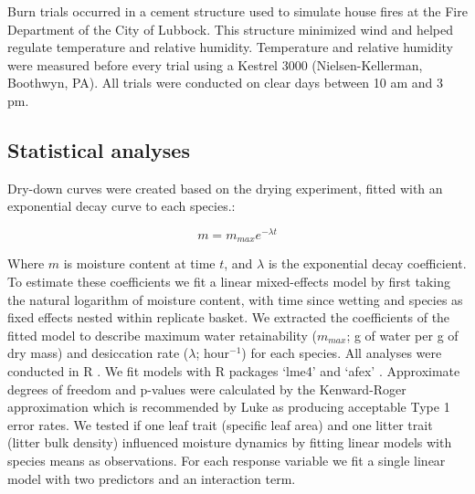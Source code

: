 \documentclass[letterpaper,12pt]{article}
\begin{document}
Burn trials occurred in a cement structure used to simulate house fires at the
Fire Department of the City of Lubbock. This structure minimized wind and
helped regulate temperature and relative humidity. Temperature and relative
humidity were measured before every trial using a Kestrel 3000
(Nielsen-Kellerman, Boothwyn, PA). All trials were conducted on clear days
between 10 am and 3 pm.

\subsection*{Statistical analyses}

Dry-down curves were created based on the drying experiment, fitted with an
exponential decay curve to each species.:

\begin{equation}
m = m_{max} e^{-\lambda t}
\end{equation}

Where $m$ is moisture content at time $t$, and $\lambda$ is the exponential
decay coefficient. To estimate these coefficients we fit a linear mixed-effects
model by first taking the natural logarithm of moisture content, with time
since wetting and species as fixed effects nested within replicate basket. We
extracted the coefficients of the fitted model to describe maximum water
retainability ($m_{max}$; g of water per g of dry mass) and desiccation rate
($\lambda$; hour$^{-1}$) for each species. All analyses were conducted in R
\citep{RCoreTeam-2019}. We fit models with R packages `lme4'
\citep{Bates_Machler_etal-2015} and `afex' \citep{Singmann_Bolker_etal-2017}.
Approximate degrees of freedom and p-values were calculated by the
Kenward-Roger approximation \citep{Kenward_Roger-1997} which is recommended by
Luke \citeyear{Luke-2017} as producing acceptable Type 1 error rates. We tested if
one leaf trait (specific leaf area) and one litter trait (litter bulk density)
influenced moisture dynamics by fitting linear models with species means as
observations. For each response variable we fit a single linear model with two
predictors and an interaction term.
\end{document}
